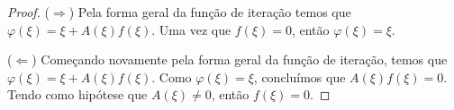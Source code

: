 
\begin{proof}
    ($\Rightarrow$) Pela forma geral da função de iteração temos que $\varphi(\xi) = \xi + A(\xi)f(\xi)$. Uma vez que $f(\xi) = 0$, então $\varphi(\xi) = \xi$.

    ($\Leftarrow$) Começando novamente pela forma geral da função de iteração, temos que $\varphi(\xi) = \xi + A(\xi)f(\xi)$. Como $\varphi(\xi) = \xi$, concluímos que $A(\xi) f(\xi) = 0$. Tendo como hipótese que $A(\xi) \neq 0$, então $f(\xi) = 0$.
\end{proof}



